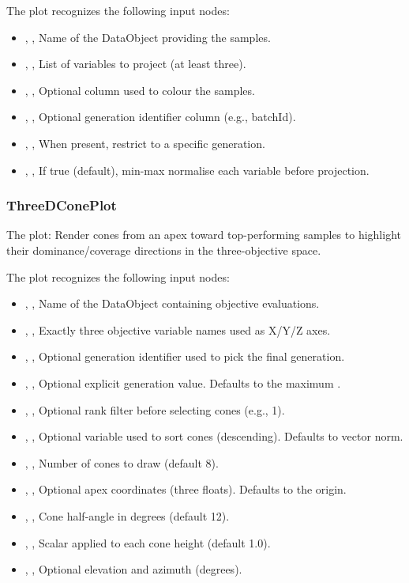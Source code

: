 The  plot recognizes the following input nodes:
\begin{itemize}
  \item {}, , Name of the DataObject providing the samples.
  \item {}, , List of variables to project (at least three).
  \item {}, , Optional column used to colour the samples.
  \item {}, , Optional generation identifier column (e.g., batchId).
  \item {}, , When  present, restrict to a specific generation.
  \item {}, , If true (default), min-max normalise each variable before projection.
\end{itemize}

\subsubsection{ThreeDConePlot}
The   plot: Render cones from an apex toward top-performing samples to highlight their dominance/coverage directions in the three-objective space.

The  plot recognizes the following input nodes:
\begin{itemize}
  \item {}, , Name of the DataObject containing objective evaluations.
  \item {}, , Exactly three objective variable names used as X/Y/Z axes.
  \item {}, , Optional generation identifier used to pick the final generation.
  \item {}, , Optional explicit generation value. Defaults to the maximum .
  \item {}, , Optional rank filter before selecting cones (e.g., 1).
  \item {}, , Optional variable used to sort cones (descending). Defaults to vector norm.
  \item {}, , Number of cones to draw (default 8).
  \item {}, , Optional apex coordinates (three floats). Defaults to the origin.
  \item {}, , Cone half-angle in degrees (default 12).
  \item {}, , Scalar applied to each cone height (default 1.0).
  \item {}, , Optional elevation and azimuth (degrees).
\end{itemize}

